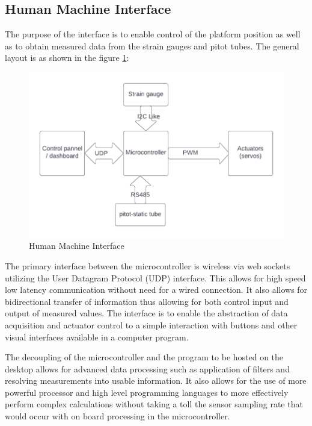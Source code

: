 \subsection{Human Machine Interface}
The purpose of the interface is to enable control of the platform position as well as to obtain measured data from the strain gauges and pitot tubes. 
The general layout is as shown in the figure \ref{fig:hmi}:
\begin{center}
\begin{figure}[H]
\centering
\includegraphics{Figures/Interface}
\caption[Human Machine Interface]{Human Machine Interface}
\label{fig:hmi}
\end{figure}
\end{center}

The primary interface between the microcontroller is wireless via web sockets utilizing the User Datagram Protocol (UDP) interface. This allows for high speed low latency communication without need for a wired connection. It also allows for bidirectional transfer of information thus allowing for both control input and output of measured values. The interface is to enable the abstraction of data acquisition and actuator control to a simple interaction with buttons and other visual interfaces available in a computer program.

The decoupling of the microcontroller and the program to be hosted on the desktop allows for advanced data processing such as application of filters and resolving measurements into usable information. It also allows for the use of more powerful processor and high level programming languages to more effectively perform complex calculations without taking a toll the sensor sampling rate that would occur with on board processing in the microcontroller.

